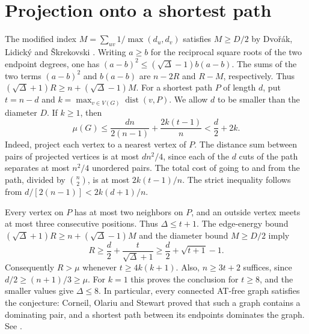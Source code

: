\documentclass[11pt,a4paper]{article}
\newcommand{\dist}{\operatorname{dist}}\newcommand{\ecc}{\operatorname{ecc}}
\begin{document}
\section{Projection onto a shortest path}
The modified index $M=\sum_{uv}1/\max(d_u,d_v)$ satisfies $M\ge D/2$
by Dvo\v{r}\'ak, Lidick\'y and \v{S}krekovski \cite[Theorem~3]{p07-DLS}.
Writing $a\ge b$ for the reciprocal square roots of the two endpoint
degrees, one has $(a-b)^2\le(\sqrt{\Delta}-1)b(a-b)$. The sums of the two
terms $(a-b)^2$ and $b(a-b)$ are $n-2R$ and $R-M$, respectively.
Thus $(\sqrt{\Delta}+1)R\ge n+(\sqrt{\Delta}-1)M$.
For a shortest path $P$ of length $d$, put $t=n-d$ and
$k=\max_{v\in V(G)}\dist(v,P)$. We allow $d$ to be smaller than the
diameter $D$. If $k\ge1$, then
\begin{equation}\label{p07-eq:faj-pathprojection}
 \mu(G)\le \frac{dn}{2(n-1)}+\frac{2k(t-1)}n<\frac d2+2k.
\end{equation}
Indeed, project each vertex to a nearest vertex of $P$. The distance
sum between pairs of projected vertices is at most $dn^2/4$, since
each of the $d$ cuts of the path separates at most $n^2/4$ unordered
pairs. The total cost of going to and from the path, divided by
$\binom n2$, is at most $2k(t-1)/n$. The strict inequality follows
from $d/[2(n-1)]<2k(d+1)/n$.

Every vertex on $P$ has at most two neighbors on $P$, and an outside
vertex meets at most three consecutive positions. Thus $\Delta\le t+1$.
The edge-energy bound $(\sqrt\Delta+1)R\ge n+(\sqrt\Delta-1)M$
and the diameter bound $M\ge D/2$ imply
\[
 R\ge\frac d2+\frac{t}{\sqrt\Delta+1}
 \ge\frac d2+\sqrt{t+1}-1.
\]
Consequently $R>\mu$ whenever $t\ge4k(k+1)$. Also,
$n\ge3t+2$ suffices, since $d/2\ge(n+1)/3\ge\mu$.
For $k=1$ this proves the conclusion for $t\ge8$, and the smaller
values give $\Delta\le8$. In particular, every connected AT-free
graph satisfies the conjecture: Corneil, Olariu and Stewart proved
that such a graph contains a dominating pair, and a shortest path between
its endpoints dominates the graph. See \cite{p07-COS}.
\end{document}
